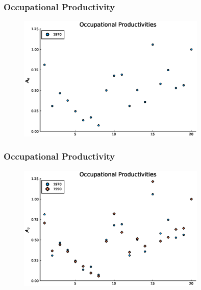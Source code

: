 \documentclass[11pt]{beamer}
\begin{document}
\begin{frame}
	\frametitle{Occupational Productivity}
	\label{aggprod}
	\begin{figure}
		\begin{center}
			\includegraphics[width=0.8\textwidth]{plots/A_men_70.eps}
			\label{ }
		\end{center}
	\end{figure}
\end{frame}

\begin{frame}
	\frametitle{Occupational Productivity}
	\begin{figure}
		\begin{center}
			\includegraphics[width=0.8\textwidth]{plots/A_men_70_90.eps}
			\label{ }
		\end{center}
	\end{figure}
\end{frame}
\end{document}
